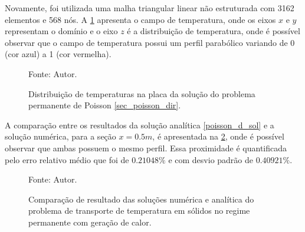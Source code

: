 Novamente, foi utilizada uma malha triangular linear não estruturada com 3162 elementos e 568 nós.
A \ref{poisson_d_3d} apresenta o campo de temperatura, onde os eixos $x$ e $y$ representam o domínio e o eixo $z$ é a distribuição de temperatura, onde é possível observar que o campo de temperatura possui um perfil parabólico variando de 0 (cor azul) a 1 (cor vermelha).
\begin{figure}[H]
    \centering
     {\raggedleft \scriptsize Fonte: Autor.}
    \caption{Distribuição de temperaturas na placa da solução do problema permanente de Poisson \ref{sec_poisson_dir}.}
    \label{poisson_d_3d}
\end{figure}

A comparação entre os resultados da solução analítica \eqref{poisson_d_sol} e a solução numérica, para a seção $x=0.5m$, é apresentada na \ref{poisson_d_perm_comp}, onde é possível observar que ambas possuem o mesmo perfil.
Essa proximidade é quantificada pelo erro relativo médio que foi de $0.21048\%$ e com desvio padrão de $0.40921\%$.
\begin{figure}[H]
    \centering
     {\raggedleft \scriptsize Fonte: Autor.}
    \caption{Comparação de resultado das soluções numérica e analítica do problema de transporte de temperatura em sólidos no regime permanente com geração de calor.}
    \label{poisson_d_perm_comp}
\end{figure}


